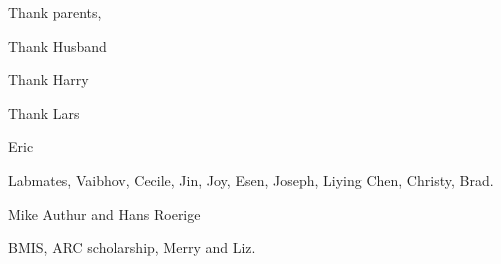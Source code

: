 Thank parents,

Thank Husband

Thank Harry

Thank Lars

Eric


Labmates, Vaibhov, Cecile, Jin, Joy, Esen, Joseph, Liying Chen, Christy, Brad.


Mike Authur and Hans Roerige

BMIS, ARC scholarship, Merry and Liz.